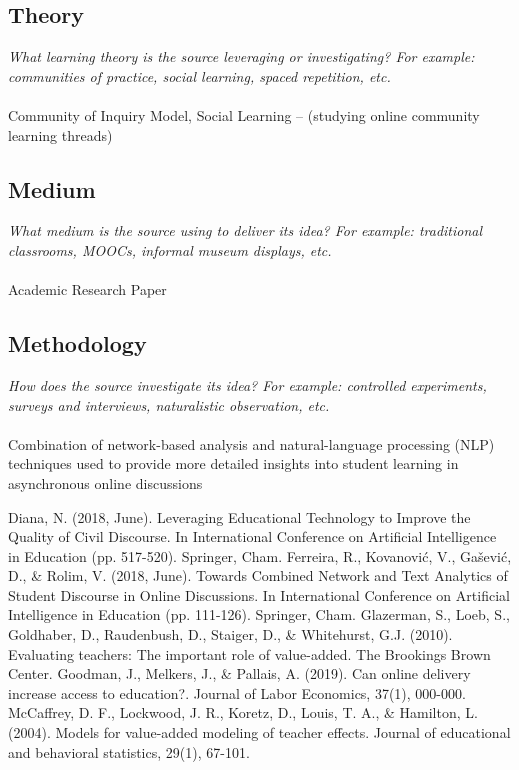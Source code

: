 \documentclass[12pt, final]{article}
\begin{document}
\subsection{Theory}
\textit{What learning theory is the source leveraging or investigating? For example: communities of practice, social learning, spaced repetition, etc.}
\\
\\
Community of Inquiry Model, Social Learning -- (studying online community learning threads)

\subsection{Medium}
\textit{What medium is the source using to deliver its idea? For example: traditional classrooms, MOOCs, informal museum displays, etc.}
\\
\\
Academic Research Paper

\subsection{Methodology}
\textit{How does the source investigate its idea? For example: controlled experiments, surveys and interviews, naturalistic observation, etc.}
\\
\\
Combination of network-based analysis and natural-language processing (NLP) techniques used to provide more detailed insights into student learning in asynchronous online discussions

  \begin{thebibliography}{1}
    Diana, N. (2018, June). Leveraging Educational Technology to Improve the Quality of Civil Discourse. In International Conference on Artificial Intelligence in Education (pp. 517-520). Springer, Cham.
    Ferreira, R., Kovanović, V., Gašević, D., \& Rolim, V. (2018, June). Towards Combined Network and Text Analytics of Student Discourse in Online Discussions. In International Conference on Artificial Intelligence in Education (pp. 111-126). Springer, Cham.
     Glazerman, S., Loeb, S., Goldhaber, D., Raudenbush, D., Staiger, D., \& Whitehurst, G.J. (2010). Evaluating teachers: The important role of value-added. The Brookings Brown Center.
     Goodman, J., Melkers, J., \& Pallais, A. (2019). Can online delivery increase access to education?. Journal of Labor Economics, 37(1), 000-000.
     McCaffrey, D. F., Lockwood, J. R., Koretz, D., Louis, T. A., \& Hamilton, L. (2004). Models for value-added modeling of teacher effects. Journal of educational and behavioral statistics, 29(1), 67-101.
  \end{thebibliography}
\end{document}
